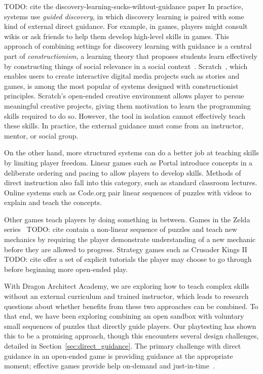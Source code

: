 \documentclass{sig-alternate}
\newcommand{\TODO}[1]{{\color{red} TODO: #1}}
\newcommand{\gametitle}{{\color{RoyalPurple} Dragon Architect Academy}}
\begin{document}
\TODO{cite the discovery-learning-sucks-wihtout-guidance paper}
In practice, systems use \emph{guided discovery}, in which discovery learning is paired with some kind of external direct guidance.  For example, in games, players might consult wikis or ask friends to help them develop high-level skills in games.
This approach of combining settings for discovery learning with guidance is a central part of \emph{constructionism}, a learning theory that proposes students learn effectively by constructing things of social relevance in a social context~\cite{kafai06constructionism}.
Scratch~\cite{maloney2010scratch}, which enables users to create interactive digital media projects such as stories and games, is among the most popular of systems designed with constructionist principles.
Scratch's open-ended creative environment allows player to persue meaningful creative projects, giving them motivation to learn the programming skills required to do so.
However, the tool in isolation cannot effectively teach these skills.
In practice, the external guidance must come from an instructor, mentor, or social group.

On the other hand, more structured systems can do a better job at teaching skills by limiting player freedom.
Linear games such as Portal introduce concepts in a deliberate ordering and pacing to allow players to develop skills.
Methods of direct instruction also fall into this category, such as standard classroom lectures.
Online systems such as Code.org pair linear sequences of puzzles with videos to explain and teach the concepts.

Other games teach players by doing something in between. 
Games in the Zelda series~\TODO{cite} contain a non-linear sequence of puzzles and teach new mechanics by requiring the player demonstrate understanding of a new mechanic before they are allowed to progress. 
Strategy games such as Crusader Kings II~\TODO{cite} offer a set of explicit tutorials the player may choose to go through before beginning more open-ended play.

With \gametitle{}, we are exploring how to teach complex skills without an external curriculum and trained instructor, which leads to research questions about whether benefits from these two approaches can be combined.
To that end, we have been exploring combining an open sandbox with voluntary small sequences of puzzles that directly guide players.
Our playtesting has shown this to be a promising approach, though this encounters several design challenges, detailed in Section~\ref{sec:direct_guidance}.
The primary challenge with direct guidance in an open-ended game is providing guidance at the appropriate moment;
effective games provide help on-demand and just-in-time~\cite{gee2003video}.
\end{document}
